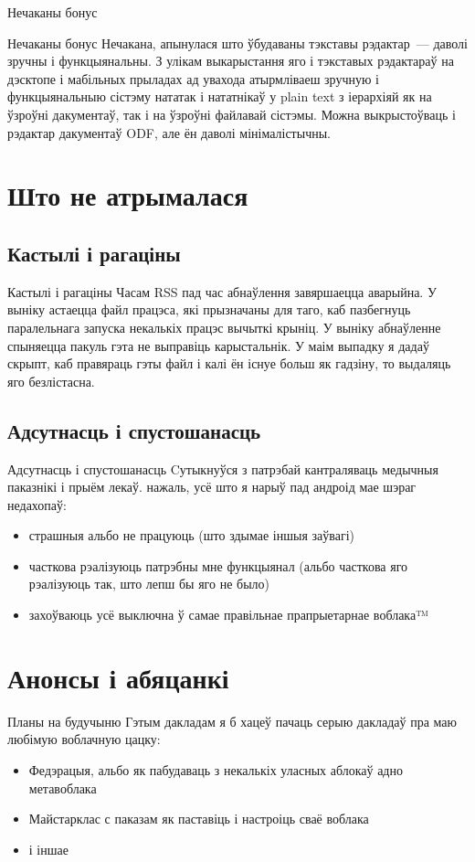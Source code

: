 \documentclass[ignorenonframetext,hyperref={pdftex,unicode}]{beamer}
\begin{document}
{Нечаканы бонус}
\begin{frame}{Нечаканы бонус}
	Нечакана, апынулася што ўбудаваны тэкставы рэдактар — даволі зручны і функцыянальны. З улікам выкарыстання яго і тэкставых рэдактараў на дэсктопе і мабільных прыладах ад увахода атырмліваеш зручную і функцыянальныю сістэму нататак і нататнікаў у plain text з іерархіяй як на ўзроўні дакументаў, так і на ўзроўні файлавай сістэмы. Можна выкрыстоўваць і рэдактар дакументаў ODF, але ён даволі мінімалістычны. 
\end{frame}

\section{Што не атрымалася}
\subsection{Кастылі і рагаціны}
\begin{frame}{Кастылі і рагаціны}
	Часам RSS пад час абнаўлення завяршаецца аварыйна. У выніку астаецца файл працэса, які прызначаны для таго, каб пазбегнуць паралельнага запуска некалькіх працэс вычыткі крыніц. У выніку абнаўленне спыняецца пакуль гэта не выправіць карыстальнік. У маім выпадку я дадаў скрыпт, каб правяраць гэты файл і калі ён існуе больш як гадзіну, то выдаляць яго безлістасна.
\end{frame}

\subsection{Адсутнасць і спустошанасць}
\begin{frame}{Адсутнасць і спустошанасць}
	Cутыкнуўся з патрэбай кантраляваць медычныя паказнікі і прыём лекаў. нажаль, усё што я нарыў пад андроід мае шэраг недахопаў:
	\begin{itemize}
		\item страшныя альбо не працуюць (што здымае іншыя заўвагі)
		\item часткова рэалізуюць патрэбны мне функцыянал (альбо часткова яго рэалізуюць так, што лепш бы яго не было)
		\item захоўваюць усё выключна ў самае правільнае прапрыетарнае воблака™
	\end{itemize}
\end{frame}

\section{Анонсы і абяцанкі}
\begin{frame}{Планы на будучыню}
	Гэтым дакладам я б хацеў пачаць серыю дакладаў пра маю любімую воблачную цацку:
	\begin{itemize}
		\item Федэрацыя, альбо як пабудаваць з некалькіх уласных аблокаў адно метавоблака
		\item Майстарклас с паказам як паставіць і настроіць сваё воблака
		\item і іншае
	\end{itemize}
\end{frame}
\end{document}
